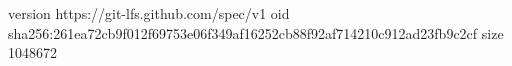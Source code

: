 version https://git-lfs.github.com/spec/v1
oid sha256:261ea72cb9f012f69753e06f349af16252cb88f92af714210c912ad23fb9c2cf
size 1048672
